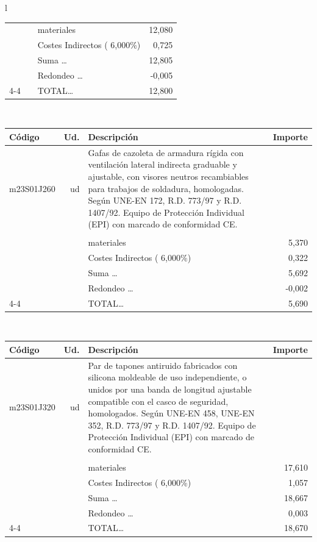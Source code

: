 \documentclass{book}%
\begin{document}
\begin{longtable}{l}
\begin{tabular}{l r p{60mm} r}
&&materiales&    12,080\\%
&&Costes Indirectos (     6,000\%)&     0,725\\%
&&Suma \ldots&    12,805\\%
&&Redondeo \ldots&    {-}0,005\\%
\cline{4-4}%
&&TOTAL\ldots&    12,800\\%
\end{tabular}\\%
\begin{tabular}{l r p{60mm} r}%
Código&Ud.&Descripción&Importe\\%
\hline%
m23S01J260&ud&Gafas de cazoleta de armadura rígida con ventilación lateral indirecta graduable y ajustable, con visores neutros recambiables para trabajos de soldadura, homologadas. Según UNE{-}EN 172, R.D. 773/97 y R.D. 1407/92. Equipo de Protección Individual (EPI) con marcado de conformidad CE.&\\%
&&&\\%
&&materiales&     5,370\\%
&&Costes Indirectos (     6,000\%)&     0,322\\%
&&Suma \ldots&     5,692\\%
&&Redondeo \ldots&    {-}0,002\\%
\cline{4-4}%
&&TOTAL\ldots&     5,690\\%
\end{tabular}\\%
\begin{tabular}{l r p{60mm} r}%
Código&Ud.&Descripción&Importe\\%
\hline%
m23S01J320&ud&Par de tapones antiruido fabricados con silicona moldeable de uso independiente, o unidos por una banda de longitud ajustable compatible con el casco de seguridad, homologados. Según UNE{-}EN 458, UNE{-}EN 352, R.D. 773/97 y R.D. 1407/92. Equipo de Protección Individual (EPI) con marcado de conformidad CE.&\\%
&&&\\%
&&materiales&    17,610\\%
&&Costes Indirectos (     6,000\%)&     1,057\\%
&&Suma \ldots&    18,667\\%
&&Redondeo \ldots&     0,003\\%
\cline{4-4}%
&&TOTAL\ldots&    18,670\\%
\end{tabular}\\%
\begin{tabular}{l r p{60mm} r}%

\end{tabular}
\end{longtable}
\end{document}
